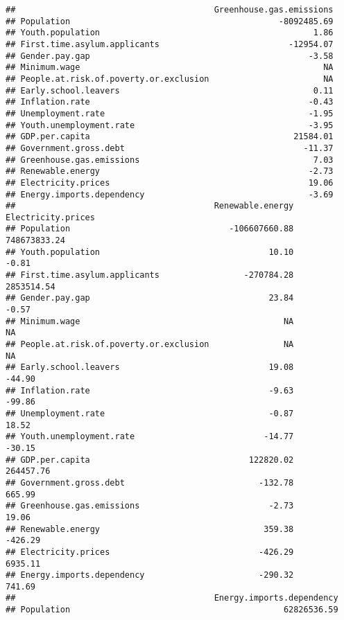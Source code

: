 \documentclass[
]{article}
\begin{document}
\begin{verbatim}
##                                        Greenhouse.gas.emissions
## Population                                          -8092485.69
## Youth.population                                           1.86
## First.time.asylum.applicants                          -12954.07
## Gender.pay.gap                                            -3.58
## Minimum.wage                                                 NA
## People.at.risk.of.poverty.or.exclusion                       NA
## Early.school.leavers                                       0.11
## Inflation.rate                                            -0.43
## Unemployment.rate                                         -1.95
## Youth.unemployment.rate                                   -3.95
## GDP.per.capita                                         21584.01
## Government.gross.debt                                    -11.37
## Greenhouse.gas.emissions                                   7.03
## Renewable.energy                                          -2.73
## Electricity.prices                                        19.06
## Energy.imports.dependency                                 -3.69
##                                        Renewable.energy Electricity.prices
## Population                                -106607660.88       748673833.24
## Youth.population                                  10.10              -0.81
## First.time.asylum.applicants                 -270784.28         2853514.54
## Gender.pay.gap                                    23.84              -0.57
## Minimum.wage                                         NA                 NA
## People.at.risk.of.poverty.or.exclusion               NA                 NA
## Early.school.leavers                              19.08             -44.90
## Inflation.rate                                    -9.63             -99.86
## Unemployment.rate                                 -0.87              18.52
## Youth.unemployment.rate                          -14.77             -30.15
## GDP.per.capita                                122820.02          264457.76
## Government.gross.debt                           -132.78             665.99
## Greenhouse.gas.emissions                          -2.73              19.06
## Renewable.energy                                 359.38            -426.29
## Electricity.prices                              -426.29            6935.11
## Energy.imports.dependency                       -290.32             741.69
##                                        Energy.imports.dependency
## Population                                           62826536.59

\end{verbatim}
\end{document}
